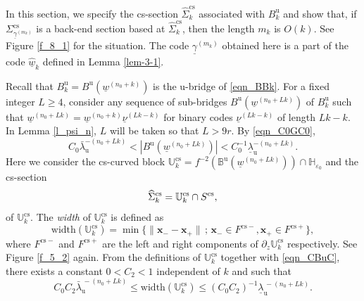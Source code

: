 \documentclass{amsart}
\theoremstyle{definition}
\numberwithin{equation}{section}
\numberwithin{figure}{section}
\begin{document}
In this section, we specify the cs-section $\widehat\Sigma_k^{\mathrm{cs}}$ associated with $B_k^{\mathrm{u}}$ 
and show that, if $\Sigma_{\underline{\gamma}^{(m_k)}}^{\mathrm{cs}}$ is a back-end section based at 
$\widehat\Sigma_k^{\mathrm{cs}}$, then the length $m_k$ is $O(k)$.
See Figure \ref{f_8_1} for the situation.
The code $\underline{\gamma}^{(m_k)}$ obtained here is a part of 
the code $\widehat{\underline{w}}_k$ defined in Lemma \ref{lem-3-1}.




Recall that $B_k^{\mathrm{u}}=B^{\mathrm{u}}(\underline{w}^{(n_0+k)})$ is the $\mathrm{u}$-bridge of \eqref{eqn_BBk}.
For a fixed integer $L\geq 4$, consider any sequence of sub-bridges 
$B^{\mathrm{u}}(\underline{w}^{(n_0+Lk)})$ of $B_k^{\mathrm{u}}$ 
such that 
$\underline{w}^{(n_0+Lk)}=\underline{w}^{(n_0+k)}\underline{\nu}^{(Lk-k)}$  for binary codes $\underline{\nu}^{(Lk-k)}$ of length $Lk-k$.
In Lemma \ref{l_psi_n}, $L$ will be taken so that $L>9r$.
By \eqref{eqn_C0GC0},
\begin{equation}\label{eqn_CBuC}
C_0\bar{\lambda}_{\mathrm{u}}^{-(n_0+Lk)}<|B^{\mathrm{u}}(\underline{w}^{(n_0+Lk)})|<C_0^{-1}\underline{\lambda}_{\mathrm{u}}^{-(n_0+Lk)}.
\end{equation}
Here we consider the cs-curved block 
$\mathbb{U}_k^{\mathrm{cs}}=f^{-2}(\mathbb{B}^{\mathrm{u}}(\underline{w}^{(n_0+Lk)}))\cap \mathbb{H}_{\varepsilon_0}$ 
and the cs-section  
$$\widehat\Sigma_{k}^{\mathrm{cs}}=\mathbb{U}_{k}^{\mathrm{cs}}\cap S^{\mathrm{cs}},
\index{Sgkcsh@$\widehat{\Sigma}_{k}^{\mathrm{cs}}$}$$
of $\mathbb{U}_{k}^{\mathrm{cs}}$.
The \emph{width} of $\mathbb{U}_k^{\mathrm{cs}}$ is defined as
$$\mathrm{width}(\mathbb{U}_{k}^{\mathrm{cs}})=\min\{\|\boldsymbol{x}_- -\boldsymbol{x}_+\|\,;\,
\boldsymbol{x}_-\in F^{\mathrm{cs} -}, \boldsymbol{x}_+\in F^{\mathrm{cs}+}\},$$ 
where $F^{\mathrm{cs} -}$ and $F^{\mathrm{cs}+}$ are the left and right components of $\partial_z\mathbb{U}_k^{\mathrm{cs}}$ respectively.
See Figure \ref{f_5_2} again.
From the definitions of $\mathbb{U}_{k}^{\mathrm{cs}}$ together with \eqref{eqn_CBuC}, 
there exists a constant $0<C_2<1$ independent of $k$ and such that
\begin{equation}\label{eqn_piB}
C_0C_2\bar{\lambda}_{\mathrm{u}}^{\,-(n_0+Lk)}
\leq \mathrm{width}(\mathbb{U}_k^{\mathrm{cs}})\leq (C_0C_2)^{-1}\underline{\lambda}_{\mathrm{u}}^{\,-(n_0+Lk)}.
\end{equation}
\end{document}
